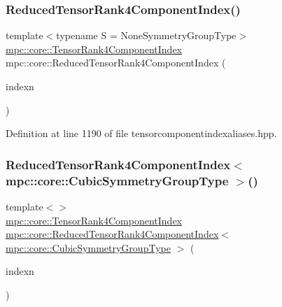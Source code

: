 \subsubsection{\texorpdfstring{Reduced\+Tensor\+Rank4\+Component\+Index()}{ReducedTensorRank4ComponentIndex()}\hspace{0.1cm}{\footnotesize\ttfamily [2/2]}}
{\footnotesize\ttfamily template$<$typename S  = None\+Symmetry\+Group\+Type$>$ \\
\mbox{\hyperlink{namespacempc_1_1core_a54c081f41b2475abd10182bf023805d2}{mpc\+::core\+::\+Tensor\+Rank4\+Component\+Index}} mpc\+::core\+::\+Reduced\+Tensor\+Rank4\+Component\+Index (\begin{DoxyParamCaption}\item[{const \mbox{\hyperlink{namespacempc_1_1core_a7ae080dac58868c1e167479dce34928a}{mpc\+::core\+::\+Tensor\+Rank2\+Component\+Index}} \&}]{indexn }\end{DoxyParamCaption})\hspace{0.3cm}{\ttfamily [inline]}}



Definition at line 1190 of file tensorcomponentindexaliases.\+hpp.

\mbox{\label{namespacempc_1_1core_ab982d8ea9335e8a18cd3cd4aea421048}} 
\subsubsection{\texorpdfstring{Reduced\+Tensor\+Rank4\+Component\+Index$<$ mpc\+::core\+::\+Cubic\+Symmetry\+Group\+Type $>$()}{ReducedTensorRank4ComponentIndex< mpc::core::CubicSymmetryGroupType >()}}
{\footnotesize\ttfamily template$<$$>$ \\
\mbox{\hyperlink{namespacempc_1_1core_a54c081f41b2475abd10182bf023805d2}{mpc\+::core\+::\+Tensor\+Rank4\+Component\+Index}} \mbox{\hyperlink{namespacempc_1_1core_ae67b259d682419c12fa2e072049d20ad}{mpc\+::core\+::\+Reduced\+Tensor\+Rank4\+Component\+Index}}$<$ \mbox{\hyperlink{structmpc_1_1core_1_1_cubic_symmetry_group_type}{mpc\+::core\+::\+Cubic\+Symmetry\+Group\+Type}} $>$ (\begin{DoxyParamCaption}\item[{const \mbox{\hyperlink{namespacempc_1_1core_a54c081f41b2475abd10182bf023805d2}{mpc\+::core\+::\+Tensor\+Rank4\+Component\+Index}} \&}]{indexn }\end{DoxyParamCaption})\hspace{0.3cm}{\ttfamily [inline]}}



